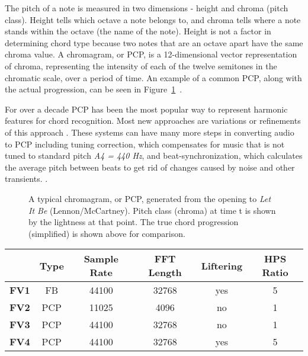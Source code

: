 \documentclass{sig-alternate}
\begin{document}
The pitch of a note is measured in two dimensions - height and chroma (pitch class). Height tells which octave a note belongs to, and chroma tells where a note stands within the octave (the name of the note). Height is not a factor in determining chord type because two notes that are an octave apart have the same chroma value. A chromagram, or PCP, is a 12-dimensional vector representation of chroma, representing the intensity of each of the twelve semitones in the chromatic scale, over a period of time. An example of a common PCP, along with the actual progression, can be seen in Figure~\ref{fig:fig4}~\cite{McVicar:2014}. 

For over a decade PCP has been the most popular way to represent harmonic features for chord recognition. Most new approaches are variations or refinements of this approach \cite{TaeMin:2014}. These systems can have many more steps in converting audio to PCP including tuning correction, which compensates for music that is not tuned to standard pitch \textit{A4 = 440 Hz}, and beat-synchronization, which calculates the average pitch between beats to get rid of changes caused by noise and other transients. \cite{McVicar:2014}.


\begin{figure}
\centering
{}
\caption{A typical chromagram, or PCP, generated from the opening to \textit{Let It Be} (Lennon/McCartney). Pitch class (chroma) at time t is shown by the lightness at that point. The true chord progression (simplified) is shown above for comparison.}
\label{fig:fig4}
\end{figure}

\begin{table*}
\centering
\begin{tabular}{|c|c|c|c|c|c|} \hline
 & \textbf{Type} & \textbf{Sample Rate} & \textbf{FFT Length} & \textbf{Liftering} & \textbf{HPS Ratio} \\ \hline
\textbf{FV1} & FB & 44100 & 32768 & yes & 5 \\ \hline
\textbf{FV2} & PCP & 11025 & 4096 & no & 1 \\ \hline
\textbf{FV3} & PCP & 44100 & 32768 & no & 1 \\ \hline
\textbf{FV4} & PCP & 44100 & 32768 & yes & 5 \\ \hline
\end{tabular}
\caption{Feature Vectors, or combinations of methods used for feature extraction, for isolated chord recognition in research case 1~\cite{Morman:2006}.}
\label{tab:tab2}
\end{table*} 
\end{document}
